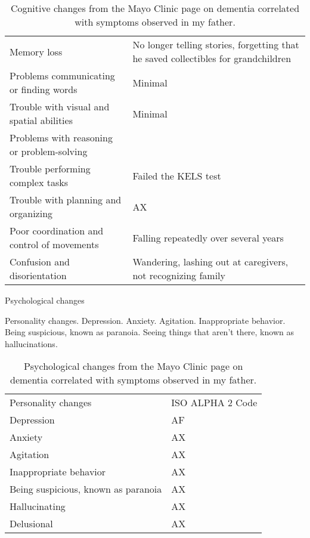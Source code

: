 \documentclass{article}
\begin{document}
\begin{table}[h!]
\centering
\begin{tabularx}{ 0.8\textwidth }{ | >{\raggedright\arraybackslash}X | >{\centering\arraybackslash}X | }
 \hline
 \multicolumn{2}{|c|}{Cognitive Changes} \\
 \hline
 Memory loss& No longer telling stories, forgetting that he saved collectibles for grandchildren\\
 \hline
 Problems communicating or finding words & Minimal  \\
 \hline
 Trouble with visual and spatial abilities&  Minimal \\
 \hline
 Problems with reasoning or problem-solving&  \\
 \hline
 Trouble performing complex tasks & Failed the KELS test  \\
 \hline
 Trouble with planning and organizing&   AX  \\
 \hline
 Poor coordination and control of movements & Falling repeatedly over several years  \\
 \hline
 Confusion and disorientation & Wandering, lashing out at caregivers, not recognizing family  \\
 \hline
\end{tabularx}
\caption{Cognitive changes from the Mayo Clinic page on dementia correlated with symptoms observed in my father.}
\end{table}

Psychological changes

    Personality changes.
    Depression.
    Anxiety.
    Agitation.
    Inappropriate behavior.
    Being suspicious, known as paranoia.
    Seeing things that aren't there, known as hallucinations.




\begin{table}[h!]
\centering
\begin{tabularx}{ 0.8\textwidth }{ | >{\raggedright\arraybackslash}X | >{\centering\arraybackslash}X | }
 \hline
 \multicolumn{2}{|c|}{Psychological Changes} \\
 \hline
 Personality changes& ISO ALPHA 2 Code\\
 \hline
 Depression   & AF   \\
 \hline
 Anxiety&   AX  \\
 \hline
 Agitation&   AX  \\
 \hline
 Inappropriate behavior&   AX  \\
 \hline
 Being suspicious, known as paranoia&   AX  \\
 \hline
 Hallucinating&   AX  \\
 \hline
 Delusional&   AX  \\
 \hline
\end{tabularx}
\caption{Psychological changes from the Mayo Clinic page on dementia correlated with symptoms observed in my father.}
\end{table}
\end{document}
